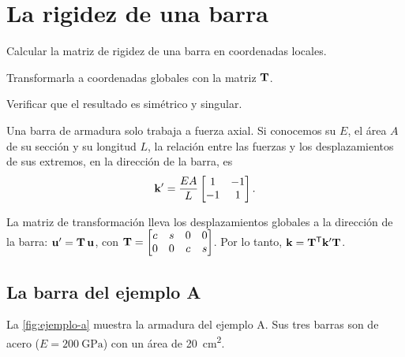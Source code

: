 \documentclass[
  fontsize=10.5pt,
  twoside=true,
  headings=standardclasses,
  numbers=noenddot,
]{scrbook}
\begin{document}
\setcounter{chapter}{4}
\chapter{La rigidez de una barra}

\begin{objetivos}
  \item Calcular la matriz de rigidez de una barra en coordenadas locales.
  \item Transformarla a coordenadas globales con la matriz $\mathbf{T}$.
  \item Verificar que el resultado es simétrico y singular.
\end{objetivos}

Una barra de armadura solo trabaja a fuerza axial. Si conocemos su
 $E$, el área $A$ de su
sección y su longitud $L$, la relación entre las fuerzas y los desplazamientos
de sus extremos, en la dirección de la barra, es
\begin{equation}\label{eq:rigidez-local}
  \mathbf{k}' = \frac{EA}{L}
  \begin{bmatrix} 1 & -1 \\ -1 & 1 \end{bmatrix}.
\end{equation}

\begin{recuerda}
La matriz de transformación lleva los desplazamientos globales a la dirección
de la barra: $\mathbf{u}' = \mathbf{T}\,\mathbf{u}$, con
$\mathbf{T} = \begin{bmatrix} c & s & 0 & 0 \\ 0 & 0 & c & s \end{bmatrix}$.
Por lo tanto, $\mathbf{k} = \mathbf{T}^\mathsf{T} \mathbf{k}' \mathbf{T}$.
\end{recuerda}

\section{La barra del ejemplo A}

La \cref{fig:ejemplo-a} muestra la armadura del ejemplo A. Sus tres barras son
de acero ($E = \SI{200}{\giga\pascal}$) con un área de \SI{20}{\centi\metre\squared}.
\end{document}
